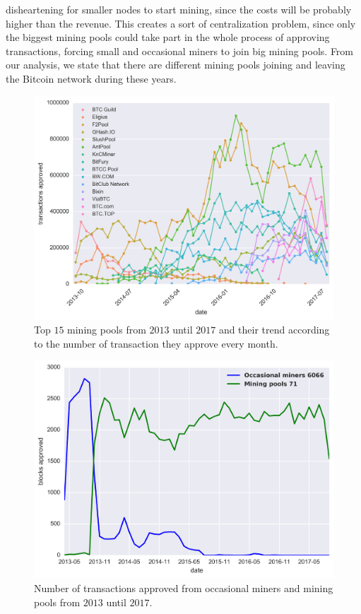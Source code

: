 \documentclass[USenglish]{uit-thesis}
\begin{document}
disheartening for smaller nodes to start mining, since the costs
will be probably higher than the revenue.
This creates a sort of centralization problem, since
only the biggest mining pools could take part in the whole
process of approving transactions, forcing small and
occasional miners to join big mining pools.
From our analysis, we state that there are different mining pools
joining and leaving the Bitcoin network during these years.
\begin{figure}[h]
	\centering
	\includegraphics[width=1\linewidth]{img/trendy_miners}
	\caption{Top $15$ mining pools from $2013$ until $2017$ and their trend
		according to the number of transaction they approve every month.}
	\label{fig:trendy_miners}
\end{figure}
\begin{figure}[h]
	\centering
	\includegraphics[width=1\textwidth]{img/top_miners_monthly}
	\caption{Number of transactions approved from occasional miners and mining pools from $2013$ until $2017$.}
	\label{fig:top_miners_monthly}
\end{figure}
\end{document}
